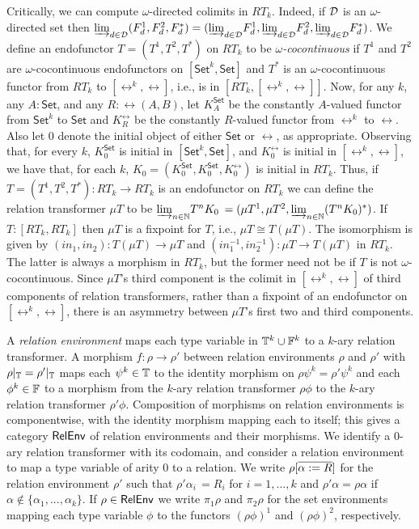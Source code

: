 \documentclass[runningheads]{llncs}
\newcommand{\set}{\mathsf{Set}}
\begin{document}
Critically, we can compute $\omega$-directed colimits in
$RT_k$. Indeed, if $\cal D$ is an $\omega$-directed set then ${{\underrightarrow{\lim}}_{d
  \in {\cal D}}{(F^1_d, F^2_d,F^*_d)}} = ({{\underrightarrow{\lim}}_{d \in {\cal
    D}}{F^1_d}}, {{\underrightarrow{\lim}}_{d \in {\cal D}}{F^2_d}}, {{\underrightarrow{\lim}}_{d \in {\cal
    D}}{F^*_d}})$.  We define an endofunctor $T = (T^1,T^2,T^*)$ on
$RT_k$ to be {\em $\omega$-cocontinuous} if $T^1$ and $T^2$ are
$\omega$-cocontinuous endofunctors on $[\set^k,\set]$ and $T^*$ is an
$\omega$-cocontinuous functor from $RT_k$ to $[\rel^k,\rel]$, i.e., is
in $[RT_k,[\rel^k,\rel]]$.  Now, for any $k$, any $A : \set$, and any
$R : \rel(A, B)$, let $K^\set_A$ be the constantly $A$-valued functor
from $\set^k$ to $\set$ and $K^\rel_R$ be the constantly $R$-valued
functor from $\rel^k$ to $\rel$.  Also let $0$ denote the initial
object of either $\set$ or $\rel$, as appropriate. Observing that, for
every $k$, $K^\set_0$ is initial in $[\set^k,\set]$, and $K^\rel_0$ is
initial in $[\rel^k,\rel]$, we have that, for each $k$, $K_0 =
(K^\set_0,K^\set_0,K^\rel_0)$ is initial in $RT_k$. Thus, if $T =
(T^1,T^2,T^*) : RT_k \to RT_k$ is an endofunctor on $RT_k$ we can
define the relation transformer $\mu T$ to be ${{\underrightarrow{\lim}}_{n \in \mathbb{N}}{T^n
  K_0}}$ $= (\mu T^1,\mu T^2, {{\underrightarrow{\lim}}_{n \in \mathbb{N}}{(T^nK_0)^*}})$.  If $T
: [RT_k,RT_k]$ then $\mu T$ is a fixpoint for $T$, i.e., $\mu T \cong
T(\mu T)$.  The isomorphism is given by $(\mathit{in}_1,
\mathit{in}_2) : T(\mu T) \to \mu T$ and $(in_1^{-1}, in_2^{-1}) : \mu
T \to T(\mu T)$ in $RT_k$. The latter is always a morphism in $RT_k$,
but the former need not be if $T$ is not $\omega$-cocontinuous.
Since $\mu T$'s third component is the colimit in
$[\rel^k,\rel]$ of third components of relation transformers, rather
than a fixpoint of an endofunctor on $[\rel^k,\rel]$,
there is an asymmetry between $\mu T$'s first two and third
components.

A {\em relation environment} maps each type variable in $\mathbb{T}^k \cup
\mathbb{F}^k$ to a $k$-ary relation transformer.  A morphism $f : \rho \to
\rho'$ between relation environments $\rho$ and $\rho'$ with
$\rho|_{\mathbb{T}} = \rho'|_{\mathbb{T}}$ maps each $\psi^k \in \mathbb{T}$ to the
identity morphism on $\rho \psi^k = \rho' \psi^k$ and each $\phi^k \in
\mathbb{F}$ to a morphism from the $k$-ary relation transformer $\rho
\phi$ to the $k$-ary relation transformer $\rho' \phi$. Composition of
morphisms on relation environments is componentwise, with the identity
morphism mapping each to itself; this gives a category $\mathsf{RelEnv}$ of
relation environments and their morphisms.  We identify a $0$-ary
relation transformer with its codomain, and consider a relation
environment to map a type variable of arity $0$ to a relation.  We
write $\rho[\overline{\alpha := R}]$ for the relation environment $\rho'$
such that $\rho' \alpha_i \, = R_i$ for $i = 1,...,k$ and $\rho'
\alpha = \rho\alpha$ if $\alpha \not \in \{\alpha_1,...,\alpha_k\}$.
If $\rho \in \mathsf{RelEnv}$ we write $\pi_1 \rho$ and $\pi_2 \rho$ for the
set environments mapping each type variable $\phi$ to the functors
$(\rho\phi)^1$ and $(\rho\phi)^2$, respectively.
\end{document}
